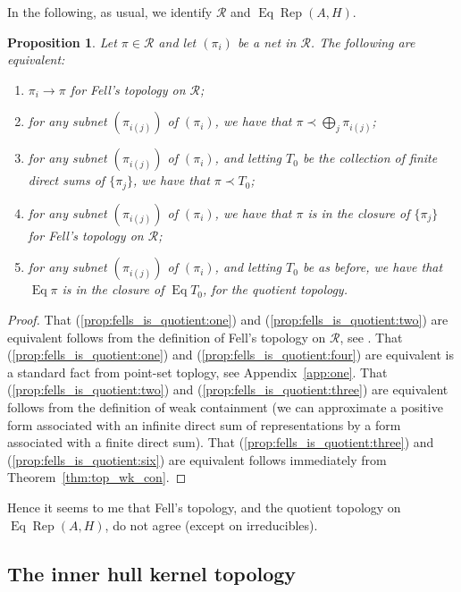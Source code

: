 \documentclass[a4paper,11pt]{article}
\newcommand{\mc}[1]{{\mathcal{#1}}}
\newcommand{\Rep}{\operatorname{Rep}}
\newcommand{\Eq}{\operatorname{Eq}}
\newtheorem{proposition}[lemma]{Proposition}
\begin{document}
In the following, as usual, we identify $\mc R$ and $\Eq\Rep(A,H)$.

\begin{proposition}\label{prop:fells_is_quotient}
Let $\pi\in\mc R$ and let $(\pi_i)$ be a net in $\mc R$.
The following are equivalent:
\begin{enumerate}
\item\label{prop:fells_is_quotient:one}
$\pi_i \rightarrow \pi$ for Fell's topology on $\mc R$;
\item\label{prop:fells_is_quotient:two}
for any subnet $(\pi_{i(j)})$ of $(\pi_i)$, we have that
$\pi\prec \bigoplus_j \pi_{i(j)}$;
\item\label{prop:fells_is_quotient:three}
for any subnet $(\pi_{i(j)})$ of $(\pi_i)$, and letting $T_0$ be the collection
of finite direct sums of $\{\pi_j\}$, we have that $\pi\prec T_0$;
\item\label{prop:fells_is_quotient:four}
for any subnet $(\pi_{i(j)})$ of $(\pi_i)$, we have that
$\pi$ is in the closure of $\{\pi_j\}$ for Fell's topology on $\mc R$;
\item\label{prop:fells_is_quotient:six}
for any subnet $(\pi_{i(j)})$ of $(\pi_i)$, and letting $T_0$ be as before,
we have that $\Eq\pi$ is in the closure of $\Eq T_0$, for the quotient topology.
\end{enumerate}
\end{proposition}
\begin{proof}
That (\ref{prop:fells_is_quotient:one}) and (\ref{prop:fells_is_quotient:two})
are equivalent follows from the definition of Fell's topology on $\mc R$,
see \cite[Proposition~F.2.2]{bhv}.  That (\ref{prop:fells_is_quotient:one})
and (\ref{prop:fells_is_quotient:four}) are equivalent is a standard fact from
point-set toplogy, see Appendix~\ref{app:one}.
That (\ref{prop:fells_is_quotient:two}) and (\ref{prop:fells_is_quotient:three})
are equivalent follows from the definition of weak containment (we can
approximate a positive form associated with an infinite direct sum of
representations by a form associated with a finite direct sum).
That (\ref{prop:fells_is_quotient:three}) and (\ref{prop:fells_is_quotient:six})
are equivalent follows immediately from Theorem~\ref{thm:top_wk_con}.
\end{proof}

Hence it seems to me that Fell's topology, and the quotient topology on
$\Eq\Rep(A,H)$, do not agree (except on irreducibles).


\subsection{The inner hull kernel topology}
\end{document}
